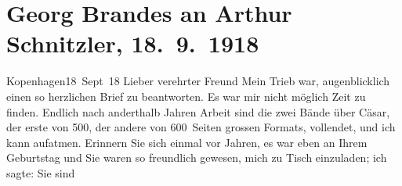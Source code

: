 

         
         \newcommand{\erwaehntePersonen}{Personen: Gaius Iulius Caesar, Peter Nansen, Gerda Philipp, Georg Philipp, Olga Schnitzler, Lili Schnitzler, Heinrich Schnitzler}
         \newcommand{\erwaehnteInstitutionen}{}
         \newcommand{\erwaehnteOrte}{Orte: Det Kongelige Teater, Dänemark, Kopenhagen, Skandinavien, Wien, Österreich}
         \newcommand{\erwaehnteWerke}{Werke: Die Brüder Menthe, Gaius Julius Cæsar, Große Szene, Literatur, Stunde des Erkennens}
               \section[Georg Brandes an Arthur Schnitzler, 18. 9. 1918]{ Georg Brandes an Arthur Schnitzler, 18. 9. 1918}\nopagebreak{}\rehead{ }\begin{ledgroupsized}[t]{13cm}\normalsize\beginnumbering \toendnotes[C]{\smallbreak\pagebreak[2]} 
\toendnotes[C]{\smallbreak}\pstart
           \raggedleft{}{\pb}Kopenhagen18 Sept 18\pend
           \pstart{}Lieber verehrter Freund\pend\pstart
           Mein Trieb war, augenblicklich einen so herzlichen Brief zu beantworten. Es war
                    mir nicht möglich Zeit zu finden. Endlich nach anderthalb Jahren Arbeit sind die
                        zwei Bände über Cäsar, der erste von 500, der andere von 600 Seiten grossen Formats, vollendet,
                    und ich kann aufatmen.\pend
           \pstart
           Erinnern Sie sich einmal vor Jahren, es war eben an Ihrem Geburtstag und Sie
                    waren so freundlich gewesen, mich zu Tisch einzuladen; ich sagte: Sie sind

\end{ledgroupsized}

